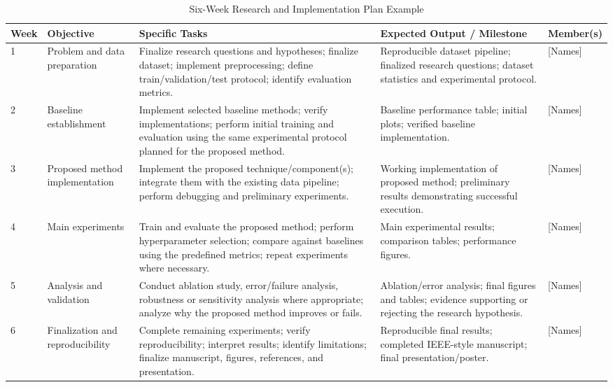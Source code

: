 \documentclass[conference]{IEEEtran}
\begin{document}
\begin{table}[h!]
\centering
\caption{Six-Week Research and Implementation Plan Example}
\label{tab:six_week_plan}
\renewcommand{\arraystretch}{1.25}

\begin{tabular}{
p{}
p{}
p{}
p{}
p{}
}
\toprule

\textbf{Week} &
\textbf{Objective} &
\textbf{Specific Tasks} &
\textbf{Expected Output / Milestone} &
\textbf{Member(s)} \\

\midrule

1 &
Problem and data preparation &
Finalize research questions and hypotheses; finalize dataset;
implement preprocessing; define train/validation/test protocol;
identify evaluation metrics. &
Reproducible dataset pipeline; finalized research questions;
dataset statistics and experimental protocol. &
[Names] \\

\midrule

2 &
Baseline establishment &
Implement selected baseline methods; verify implementations;
perform initial training and evaluation using the same
experimental protocol planned for the proposed method. &
Baseline performance table; initial plots; verified baseline
implementation. &
[Names] \\

\midrule

3 &
Proposed method implementation &
Implement the proposed technique/component(s);
integrate them with the existing data pipeline;
perform debugging and preliminary experiments. &
Working implementation of proposed method;
preliminary results demonstrating successful execution. &
[Names] \\

\midrule

4 &
Main experiments &
Train and evaluate the proposed method;
perform hyperparameter selection;
compare against baselines using the predefined metrics;
repeat experiments where necessary. &
Main experimental results; comparison tables;
performance figures. &
[Names] \\

\midrule

5 &
Analysis and validation &
Conduct ablation study, error/failure analysis,
robustness or sensitivity analysis where appropriate;
analyze why the proposed method improves or fails. &
Ablation/error analysis; final figures and tables;
evidence supporting or rejecting the research hypothesis. &
[Names] \\

\midrule

6 &
Finalization and reproducibility &
Complete remaining experiments; verify reproducibility;
interpret results; identify limitations;
finalize manuscript, figures, references, and presentation. &
Reproducible final results; completed IEEE-style manuscript;
final presentation/poster. &
[Names] \\

\bottomrule
\end{tabular}

\end{table}
\end{document}
